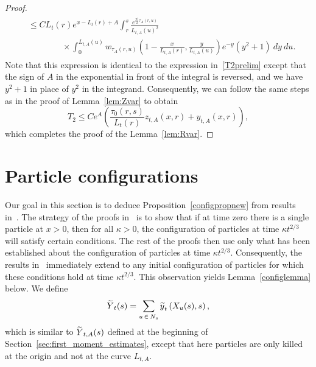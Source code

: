 \documentclass[AHL,Unicode,longabstracts,published]{cedram}
\newcommand{\1} {\mathds{1}}
\let\oldtilde\tilde
\renewcommand*{\tilde}[1]{\mathchoice{\widetilde{#1}}{\widetilde{#1}}{\oldtilde{#1}}{\oldtilde{#1}}}
\begin{document}
\begin{proof}
\begin{multline*}
\begin{aligned}
&\leq C L_t(r) e^{x - L_t(r) + A} \int_r^s \frac{e^{\frac{\pi^2}{2} \tau_A(r,u)}}{L_{t,A}(u)^2} \\
&\qquad \qquad \times \int_0^{L_{t,A}(u)} w_{\tau_A(r,u)}\left(1 - \frac{x}{L_{t,A}(r)}, \frac{y}{L_{t,A}(u)} \right) e^{-y}\left(y^2 + 1\right) \: dy \: du.
\end{aligned}
\end{multline*}
Note that this expression is identical to the expression in~\eqref{T2prelim} except that the sign of $A$ in the exponential in front of the integral is reversed, and we have $y^2 + 1$ in place of $y^2$ in the integrand. Consequently, we can follow the same steps as in the proof of Lemma~\ref{lem:Zvar} to obtain
\[
T_2 \leq C e^A \left(\frac{\tau_0(r,s)}{L_t(r)} z_{t,A}(x,r) + y_{t,A}(x,r)\right),
\]
which completes the proof of the Lemma~\ref{lem:Rvar}.
\end{proof}

\section{Particle configurations}\label{configsec}

Our goal in this section is to deduce Proposition~\ref{configpropnew} from results in~\cite{bbs3}. The strategy of the proofs in~\cite{bbs3} is to show that if at time zero there is a single particle at $x > 0$, then for all $\kappa > 0$, the configuration of particles at time $\kappa t^{2/3}$ will satisfy certain conditions. The rest of the proofs then use only what has been established about the configuration of particles at time $\kappa t^{2/3}$. Consequently, the results in~\cite{bbs3} immediately extend to any initial configuration of particles for which these conditions hold at time $\kappa t^{2/3}$. This observation yields Lemma~\ref{configlemma} below. We define
\[
{\tilde Y}_t(s) = \sum_{u\,\in\,N_s} {\tilde y}_t\left(X_u(s),s\right),
\]
which is similar to ${\tilde Y}_{t,A}(s)$ defined at the beginning of Section~\ref{sec:first_moment_estimates}, except that here particles are only killed at the origin and not at the curve $L_{t,A}$.
\end{document}
